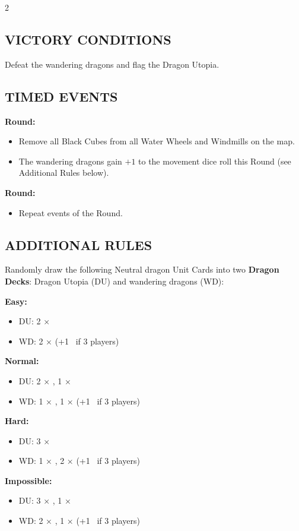 \begin{multicols}{2}
\subsection*{\MakeUppercase{Victory Conditions}}
Defeat the wandering dragons and flag the Dragon Utopia.

\subsection*{\MakeUppercase{Timed Events}}
\textbf{ Round:}
\begin{itemize}
  \item Remove all Black Cubes from all Water Wheels and Windmills on the map.
  \item The wandering dragons gain $+1$ to the movement dice roll this Round (see Additional Rules below).
\end{itemize}
\textbf{ Round:}
\begin{itemize}
  \item Repeat events of the  Round.
\end{itemize}

\subsection*{\MakeUppercase{Additional Rules}}
Randomly draw the following Neutral dragon Unit Cards into two \textbf{Dragon Decks}: Dragon Utopia (DU) and wandering dragons (WD):

\textbf{Easy:}
\begin{itemize}
  \item DU: 2 × 
  \item WD: 2 ×  (+1~ if 3 players)
\end{itemize}
\textbf{Normal:}
\begin{itemize}
  \item DU: 2 × , 1 × 
  \item WD: 1 × , 1 ×  (+1~ if 3 players)
\end{itemize}
\textbf{Hard:}
\begin{itemize}
  \item DU: 3 × 
  \item WD: 1 × , 2 ×  (+1~ if 3 players)
\end{itemize}
\textbf{Impossible:}
\begin{itemize}
  \item DU: 3 × , 1 × 
  \item WD: 2 × , 1 ×  (+1~ if 3 players)
\end{itemize}
\columnbreak


\end{multicols}
